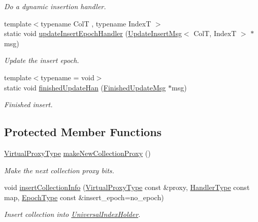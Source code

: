 \begin{DoxyCompactItemize}
\begin{DoxyCompactList}\small\item\em Do a dynamic insertion handler. \end{DoxyCompactList}\item 
{\footnotesize template$<$typename ColT , typename IndexT $>$ }\\static void \hyperlink{structvt_1_1vrt_1_1collection_1_1_collection_manager_afe9a779bc2dd8c639cf0dea5d910ec4b}{update\+Insert\+Epoch\+Handler} (\hyperlink{structvt_1_1vrt_1_1collection_1_1_update_insert_msg}{Update\+Insert\+Msg}$<$ ColT, IndexT $>$ $\ast$msg)
\begin{DoxyCompactList}\small\item\em Update the insert epoch. \end{DoxyCompactList}\item 
{\footnotesize template$<$typename  = void$>$ }\\static void \hyperlink{structvt_1_1vrt_1_1collection_1_1_collection_manager_a1e3aca203f1197782ec543da1d16b115}{finished\+Update\+Han} (\hyperlink{structvt_1_1vrt_1_1collection_1_1_finished_update_msg}{Finished\+Update\+Msg} $\ast$msg)
\begin{DoxyCompactList}\small\item\em Finished insert. \end{DoxyCompactList}\end{DoxyCompactItemize}
\subsection*{Protected Member Functions}
\begin{DoxyCompactItemize}
\item 
\hyperlink{namespacevt_a1b417dd5d684f045bb58a0ede70045ac}{Virtual\+Proxy\+Type} \hyperlink{structvt_1_1vrt_1_1collection_1_1_collection_manager_a13988c17d12744b3229d380ccef5ec07}{make\+New\+Collection\+Proxy} ()
\begin{DoxyCompactList}\small\item\em Make the next collection proxy bits. \end{DoxyCompactList}\item 
void \hyperlink{structvt_1_1vrt_1_1collection_1_1_collection_manager_a3c6539a6316568485a7e1578a0bd665e}{insert\+Collection\+Info} (\hyperlink{namespacevt_a1b417dd5d684f045bb58a0ede70045ac}{Virtual\+Proxy\+Type} const \&proxy, \hyperlink{namespacevt_af64846b57dfcaf104da3ef6967917573}{Handler\+Type} const map, \hyperlink{namespacevt_a985a5adf291c34a3ca263b3378388236}{Epoch\+Type} const \&insert\+\_\+epoch=no\+\_\+epoch)
\begin{DoxyCompactList}\small\item\em Insert collection into {\ttfamily \hyperlink{structvt_1_1vrt_1_1collection_1_1_universal_index_holder}{Universal\+Index\+Holder}}. \end{DoxyCompactList}\end{DoxyCompactItemize}
